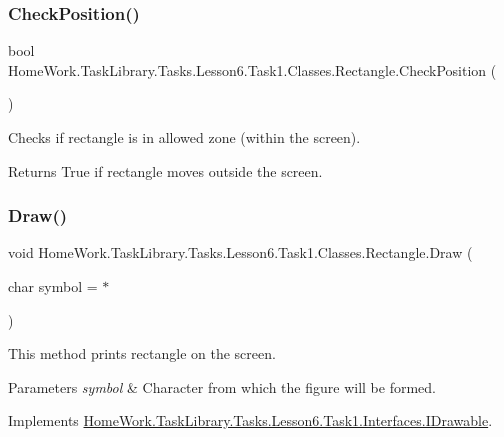 \subsubsection{\texorpdfstring{CheckPosition()}{CheckPosition()}}
{\footnotesize\ttfamily bool Home\+Work.\+Task\+Library.\+Tasks.\+Lesson6.\+Task1.\+Classes.\+Rectangle.\+Check\+Position (\begin{DoxyParamCaption}{ }\end{DoxyParamCaption})\hspace{0.3cm}{\ttfamily [private]}}



Checks if rectangle is in allowed zone (within the screen). 

\begin{DoxyReturn}{Returns}
True if rectangle moves outside the screen.
\end{DoxyReturn}
\mbox{\label{class_home_work_1_1_task_library_1_1_tasks_1_1_lesson6_1_1_task1_1_1_classes_1_1_rectangle_a8758f1f1f0fe9ba75f859aff3e1e39cf}} 
\subsubsection{\texorpdfstring{Draw()}{Draw()}}
{\footnotesize\ttfamily void Home\+Work.\+Task\+Library.\+Tasks.\+Lesson6.\+Task1.\+Classes.\+Rectangle.\+Draw (\begin{DoxyParamCaption}\item[{char}]{symbol = {\ttfamily \textquotesingle{}$\ast$\textquotesingle{}} }\end{DoxyParamCaption})}



This method prints rectangle on the screen. 


\begin{DoxyParams}{Parameters}
{\em symbol} & Character from which the figure will be formed.\\
\hline
\end{DoxyParams}


Implements \mbox{\hyperlink{interface_home_work_1_1_task_library_1_1_tasks_1_1_lesson6_1_1_task1_1_1_interfaces_1_1_i_drawable_aa8cfbe113bc9f372a0695e1d4286071c}{Home\+Work.\+Task\+Library.\+Tasks.\+Lesson6.\+Task1.\+Interfaces.\+I\+Drawable}}.

